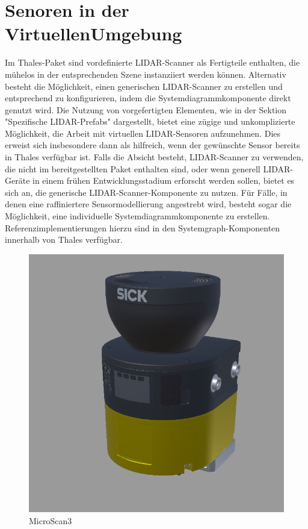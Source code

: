 \section{Senoren in der VirtuellenUmgebung}
Im Thales-Paket sind vordefinierte LIDAR-Scanner als Fertigteile enthalten, die mühelos in der entsprechenden Szene instanziiert werden können. Alternativ besteht die Möglichkeit, einen generischen LIDAR-Scanner zu erstellen und entsprechend zu konfigurieren, indem die Systemdiagrammkomponente direkt genutzt wird. Die Nutzung von vorgefertigten Elementen, wie in der Sektion "Spezifische LIDAR-Prefabs" dargestellt, bietet eine zügige und unkomplizierte Möglichkeit, die Arbeit mit virtuellen LIDAR-Sensoren aufzunehmen. Dies erweist sich insbesondere dann als hilfreich, wenn der gewünschte Sensor bereits in Thales verfügbar ist. Falls die Absicht besteht, LIDAR-Scanner zu verwenden, die nicht im bereitgestellten Paket enthalten sind, oder wenn generell LIDAR-Geräte in einem frühen Entwicklungsstadium erforscht werden sollen, bietet es sich an, die generische LIDAR-Scanner-Komponente zu nutzen. Für Fälle, in denen eine raffiniertere Sensormodellierung angestrebt wird, besteht sogar die Möglichkeit, eine individuelle Systemdiagrammkomponente zu erstellen. Referenzimplementierungen hierzu sind in den Systemgraph-Komponenten innerhalb von Thales verfügbar.\\

\begin{figure}[htp]
    \centering
    \includegraphics[width=(\textwidth/3)]{images/ModelMircoScan.PNG}
    \caption{MicroScan3}
    \label{fig:MicroScan3}
\end{figure}

